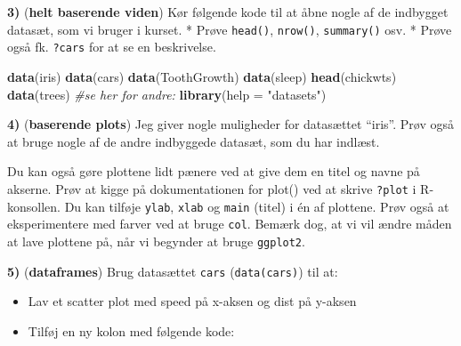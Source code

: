 \documentclass[
]{book}
\newenvironment{Shaded}{\begin{snugshade}}{\end{snugshade}}
\newcommand{\AttributeTok}[1]{\textcolor[rgb]{0.13,0.29,0.53}{#1}}
\newcommand{\CommentTok}[1]{\textcolor[rgb]{0.56,0.35,0.01}{\textit{#1}}}
\newcommand{\FunctionTok}[1]{\textcolor[rgb]{0.13,0.29,0.53}{\textbf{#1}}}
\newcommand{\NormalTok}[1]{#1}
\newcommand{\SpecialCharTok}[1]{\textcolor[rgb]{0.81,0.36,0.00}{\textbf{#1}}}
\newcommand{\StringTok}[1]{\textcolor[rgb]{0.31,0.60,0.02}{#1}}
\providecommand{\tightlist}{%
  \setlength{\itemsep}{0pt}\setlength{\parskip}{0pt}}
\theoremstyle{definition}
\theoremstyle{definition}
\theoremstyle{definition}
\theoremstyle{definition}
\theoremstyle{remark}
\begin{document}
\textbf{3)} (\textbf{helt baserende viden}) Kør følgende kode til at åbne nogle af de indbygget datasæt, som vi bruger i kurset.
* Prøve \texttt{head()}, \texttt{nrow()}, \texttt{summary()} osv.
* Prøve også fk. \texttt{?cars} for at se en beskrivelse.

\begin{Shaded}
\begin{Highlighting}[]
\FunctionTok{data}\NormalTok{(iris)}
\FunctionTok{data}\NormalTok{(cars)}
\FunctionTok{data}\NormalTok{(ToothGrowth)}
\FunctionTok{data}\NormalTok{(sleep)}
\FunctionTok{head}\NormalTok{(chickwts)}
\FunctionTok{data}\NormalTok{(trees)}
\CommentTok{\#se her for andre:}
\FunctionTok{library}\NormalTok{(}\AttributeTok{help =} \StringTok{"datasets"}\NormalTok{)}
\end{Highlighting}
\end{Shaded}

\textbf{4)} (\textbf{baserende plots}) Jeg giver nogle muligheder for datasættet ``iris''. Prøv også at bruge nogle af de andre indbyggede datasæt, som du har indlæst.

\begin{Shaded}
\end{Shaded}

Du kan også gøre plottene lidt pænere ved at give dem en titel og navne på akserne. Prøv at kigge på dokumentationen for plot() ved at skrive \texttt{?plot} i R-konsollen. Du kan tilføje \texttt{ylab}, \texttt{xlab} og \texttt{main} (titel) i én af plottene. Prøv også at eksperimentere med farver ved at bruge \texttt{col}. Bemærk dog, at vi vil ændre måden at lave plottene på, når vi begynder at bruge \texttt{ggplot2}.

\textbf{5)} (\textbf{dataframes}) Brug datasættet \texttt{cars} (\texttt{data(cars)}) til at:

\begin{itemize}
\tightlist
\item
  Lav et scatter plot med speed på x-aksen og dist på y-aksen
\item
  Tilføj en ny kolon med følgende kode:
\end{itemize}
\end{document}
